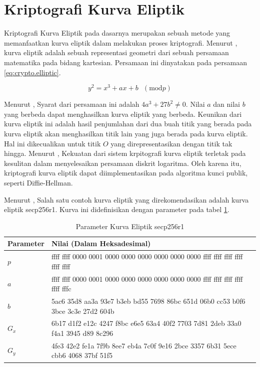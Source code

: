 \section{Kriptografi Kurva Eliptik}
Kriptografi Kurva Eliptik pada dasarnya merupakan sebuah metode yang memanfaatkan kurva eliptik dalam melakukan proses kriptografi. Menurut \textcite{betaccini2022}, kurva eliptik adalah sebuah representasi geometri dari sebuah persamaan matematika pada bidang kartesian. Persamaan ini dinyatakan pada persamaan \ref{eq:crypto.elliptic}.

\begin{equation}
  \label{eq:crypto.elliptic}
  y^2 = x^3 + ax + b\text{ }(\text{mod} p)
\end{equation}

Menurut \textcite{munir2019}, Syarat dari persamaan ini adalah $4a^3 + 27b^2 \neq 0$. Nilai $a$ dan nilai $b$ yang berbeda dapat menghasilkan kurva eliptik yang berbeda. Keunikan dari kurva eliptik ini adalah hasil penjumlahan dari dua buah titik yang berada pada kurva eliptik akan menghasilkan titik lain yang juga berada pada kurva eliptik. Hal ini dikecualikan untuk titik $O$ yang direpresentasikan dengan titik tak hingga. Menurut \textcite{betaccini2022}, Kekuatan dari sistem krpitografi kurva eliptik terletak pada kesulitan dalam menyelesaikan persamaan diskrit logaritma. Oleh karena itu, kriptografi kurva eliptik dapat diimplementasikan pada algoritma kunci publik, seperti Diffie-Hellman.

Menurut \textcite{certicom2000}, Salah satu contoh kurva eliptik yang direkomendasikan adalah kurva eliptik secp256r1. Kurva ini didefinisikan dengan parameter pada tabel \ref{tab:crypto.secp256r1}.

\begin{table}[!h]
  \centering
  \caption{Parameter Kurva Eliptik secp256r1}
  \label{tab:crypto.secp256r1}
  \begin{tabular}{|p{1in}|p{4in}|}
    \hline
    \textbf{Parameter} & \textbf{Nilai (Dalam Heksadesimal)} \\
    \hline
    $p$ & ffff ffff 0000 0001 0000 0000 0000 0000 0000 0000 ffff ffff ffff ffff ffff ffff \\ \hline
    $a$ & ffff ffff 0000 0001 0000 0000 0000 0000 0000 0000 ffff ffff ffff ffff ffff fffc \\ \hline
    $b$ & 5ac6 35d8 aa3a 93e7 b3eb bd55 7698 86bc 651d 06b0 cc53 b0f6 3bce 3c3e 27d2 604b \\ \hline
    $G_x$ & 6b17 d1f2 e12c 4247 f8bc e6e5 63a4 40f2 7703 7d81 2deb 33a0 f4a1 3945 d89 8c296 \\ \hline 
    $G_y$ & 4fe3 42e2 fe1a 7f9b 8ee7 eb4a 7c0f 9e16 2bce 3357 6b31 5ece cbb6 4068 37bf 51f5 \\ \hline
  \end{tabular}
\end{table}

